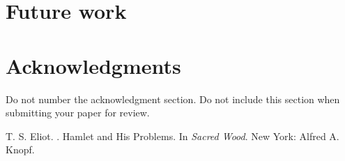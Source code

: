\documentclass[11pt]{article}
\begin{document}
\section{Future work}



\section*{Acknowledgments}

Do not number the acknowledgment section. Do not include this section when submitting your paper for review.





\begin{thebibliography}{}
T. S. Eliot.
.
\newblock Hamlet and His Problems.
\newblock In {\em Sacred Wood}.
\newblock New York: Alfred A. Knopf.

\end{thebibliography}



\clearpage
\end{document}
